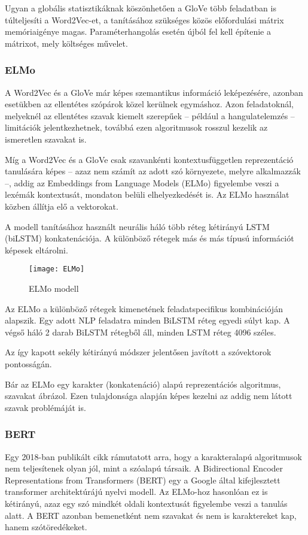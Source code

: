 Ugyan a globális statisztikáknak köszönhetően a GloVe több feladatban is túlteljesíti a Word2Vec-et, a tanításához szükséges közös előfordulási mátrix memóriaigénye magas. Paraméterhangolás esetén újból fel kell építenie a mátrixot, mely költséges művelet.

\subsubsection{ELMo}
A Word2Vec és a GloVe már képes szemantikus információ leképezésére, azonban esetükben az ellentétes szópárok közel kerülnek egymáshoz. Azon feladatoknál, melyeknél az ellentétes szavak kiemelt szerepűek – például a hangulatelemzés – limitációk jelentkezhetnek, továbbá ezen algoritmusok rosszul kezelik az ismeretlen szavakat is.

Míg a Word2Vec és a GloVe csak szavankénti kontextusfüggetlen reprezentáció tanulására képes – azaz nem számít az adott szó környezete, melyre alkalmazzák –, addig az Embeddings from Language Models (ELMo) \cite{elmo} figyelembe veszi a lexémák kontextusát, mondaton belüli elhelyezkedését is. Az ELMo használat közben állítja elő a vektorokat.

A modell tanításához használt neurális háló több réteg kétirányú LSTM (biLSTM) konkatenációja. A különböző rétegek más és más típusú információt képesek eltárolni.

\begin{figure}[H]
	\centering
	\texttt{[image: ELMo]}
	\caption{ELMo modell}
\end{figure}

Az ELMo a különböző rétegek kimenetének feladatspecifikus kombinációján alapszik. Egy adott NLP feladatra minden BiLSTM réteg egyedi súlyt kap. A végső háló 2 darab BiLSTM rétegből áll, minden LSTM réteg 4096 széles.

Az így kapott sekély kétirányú módszer jelentősen javított a szóvektorok pontosságán.

Bár az ELMo egy karakter (konkatenáció) alapú reprezentációs algoritmus, szavakat ábrázol. Ezen tulajdonsága alapján képes kezelni az addig nem látott szavak problémáját is.


\subsubsection{BERT}
Egy 2018-ban publikált cikk \cite{char} rámutatott arra, hogy a karakteralapú algoritmusok nem teljesítenek olyan jól, mint a szóalapú társaik. A Bidirectional Encoder Representations from Transformers (BERT) \cite{2018arXiv181004805D} egy a Google által kifejlesztett transformer architektúrájú nyelvi modell. Az ELMo-hoz hasonlóan ez is kétirányú, azaz egy szó mindkét oldali kontextusát figyelembe veszi a tanulás alatt. A BERT azonban bemenetként nem szavakat és nem is karaktereket kap, hanem szótöredékeket.

